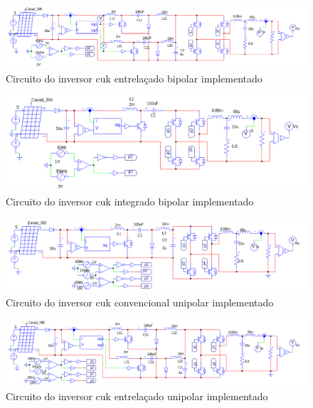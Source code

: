 \documentclass[
	12pt,				%
	openany,
	onseside,
	a4paper,			%
	english,			%
	french,				%
	spanish,			%
	brazil,				%
	]{abntex2}
\begin{document}
\begin{anexosenv}
\begin{figure}
	\end{figure}

	\begin{figure}
		\centering
		\includegraphics[width=\linewidth]{comp_interv_circ_clean}
		\caption{Circuito do inversor cuk entrelaçado bipolar implementado}	
	\end{figure}

	\begin{figure}
		\centering
		\includegraphics[width=\linewidth]{comp_integ_circ_clean}
		\caption{Circuito do inversor cuk integrado bipolar implementado}	
	\end{figure}


	\begin{figure}
		\centering
		\includegraphics[width=\linewidth]{comp_conv_circ_clean_unip}
		\caption{Circuito do inversor cuk convencional unipolar implementado}
	\end{figure}

	\begin{figure}
		\centering
		\includegraphics[width=\linewidth]{comp_interv_circ_clean_unip}
		\caption{Circuito do inversor cuk entrelaçado unipolar implementado}	
	\end{figure}


\end{anexosenv}
\end{document}
